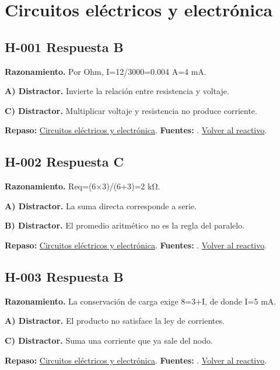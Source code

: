\section{Circuitos eléctricos y electrónica}

\subsection*{H-001 \quad Respuesta B}\label{s:H-001}
\textbf{Razonamiento.} Por Ohm, I=12/3000=0.004 A=4 mA.

\textbf{A) Distractor. }Invierte la relación entre resistencia y voltaje.

\textbf{C) Distractor. }Multiplicar voltaje y resistencia no produce corriente.

\textbf{Repaso:} \hyperref[sec:h1]{Circuitos eléctricos y electrónica}. \textbf{Fuentes:} \cite{openstax,electronics,digital}. \hyperref[q:H-001]{Volver al reactivo}.\par\medskip

\subsection*{H-002 \quad Respuesta C}\label{s:H-002}
\textbf{Razonamiento.} Req=(6×3)/(6+3)=2 kΩ.

\textbf{A) Distractor. }La suma directa corresponde a serie.

\textbf{B) Distractor. }El promedio aritmético no es la regla del paralelo.

\textbf{Repaso:} \hyperref[sec:h1]{Circuitos eléctricos y electrónica}. \textbf{Fuentes:} \cite{openstax,electronics,digital}. \hyperref[q:H-002]{Volver al reactivo}.\par\medskip

\subsection*{H-003 \quad Respuesta B}\label{s:H-003}
\textbf{Razonamiento.} La conservación de carga exige 8=3+I, de donde I=5 mA.

\textbf{A) Distractor. }El producto no satisface la ley de corrientes.

\textbf{C) Distractor. }Suma una corriente que ya sale del nodo.

\textbf{Repaso:} \hyperref[sec:h1]{Circuitos eléctricos y electrónica}. \textbf{Fuentes:} \cite{openstax,electronics,digital}. \hyperref[q:H-003]{Volver al reactivo}.\par\medskip


